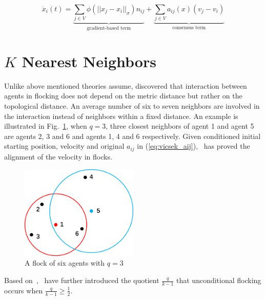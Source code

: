 \begin{equation}\label{eq:saber}
\ddot{x}_i(t)=\underbrace{\sum_{j\in V}\phi(||x_j-x_i||_{\sigma})n_{ij}}_{\text{gradient-based term}}+\underbrace{\sum_{j\in V}a_{ij}(x)(v_j-v_i)}_{\text{consensus term}}
\end{equation}

\section{$K$ Nearest Neighbors}

Unlike above mentioned theories assume, \cite{PNAS} discovered that interaction between agents in flocking does not depend on the metric distance but rather on the topological distance. An average number of six to seven neighbors are involved in the interaction instead of neighbors within a fixed distance. An example is illustrated in Fig.~\ref{fig:knn}, when $q=3$, three closest neighbors of agent 1 and agent 5 are agents 2, 3 and 6 and agents 1, 4 and 6 respectively. Given conditioned initial starting position, velocity and original $a_{ij}$ in (\ref{eq:vicsek_aij}),~\cite{KNN} has proved the alignment of the velocity in flocks.

\begin{figure}[htb]
  \centering
  \includegraphics[width=0.5\textwidth]{figure/chapter_2/knn.png}
  \caption{A flock of six agents with $q=3$}
  \label{fig:knn}
\end{figure}

\noindent
Based on~\cite{KNN},~\cite{CuckerDong2016} have further introduced the quotient $\frac{q}{k-1}$ that unconditional flocking occurs when $\frac{q}{k-1}\geq\frac{1}{2}$.

\newpage
